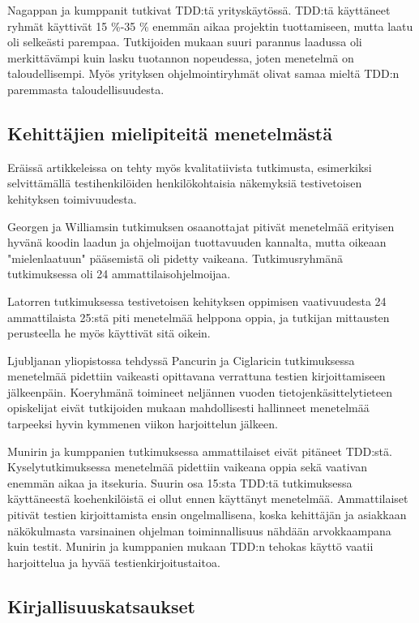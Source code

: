 \documentclass[finnish]{tktltiki2}
\theoremstyle{definition}
\theoremstyle{remark}
\begin{document}
Nagappan ja kumppanit \cite{Nagappan08} tutkivat TDD:tä yrityskäytössä. TDD:tä käyttäneet ryhmät käyttivät 15 \%-35 \% enemmän aikaa projektin tuottamiseen, mutta laatu oli selkeästi parempaa. Tutkijoiden mukaan suuri parannus laadussa oli merkittävämpi kuin lasku tuotannon nopeudessa, joten menetelmä on taloudellisempi. Myös yrityksen ohjelmointiryhmät olivat samaa mieltä TDD:n paremmasta taloudellisuudesta.

\subsection{Kehittäjien mielipiteitä menetelmästä}

Eräissä artikkeleissa on tehty myös kvalitatiivista tutkimusta, esimerkiksi selvittämällä testihenkilöiden henkilökohtaisia näkemyksiä testivetoisen kehityksen toimivuudesta.

Georgen ja Williamsin \cite{George04} tutkimuksen osaanottajat pitivät menetelmää erityisen hyvänä koodin laadun ja ohjelmoijan tuottavuuden kannalta, mutta oikeaan "mielenlaatuun" pääsemistä oli pidetty vaikeana. Tutkimusryhmänä tutkimuksessa oli 24 ammattilaisohjelmoijaa.

Latorren \cite{Latorre14} tutkimuksessa testivetoisen kehityksen oppimisen vaativuudesta 24 ammattilaista 25:stä piti menetelmää helppona oppia, ja tutkijan mittausten perusteella he myös käyttivät sitä oikein.

Ljubljanan yliopistossa tehdyssä Pancurin ja Ciglaricin\cite{Pancur11} tutkimuksessa menetelmää pidettiin vaikeasti opittavana verrattuna testien kirjoittamiseen jälkeenpäin. Koeryhmänä toimineet neljännen vuoden tietojenkäsittelytieteen opiskelijat eivät tutkijoiden mukaan mahdollisesti hallinneet menetelmää tarpeeksi hyvin kymmenen viikon harjoittelun jälkeen.

Munirin ja kumppanien \cite{Munir14} tutkimuksessa ammattilaiset eivät pitäneet TDD:stä. Kyselytutkimuksessa menetelmää pidettiin vaikeana oppia sekä vaativan enemmän aikaa ja itsekuria. Suurin osa 15:sta TDD:tä tutkimuksessa käyttäneestä koehenkilöistä ei ollut ennen käyttänyt menetelmää. Ammattilaiset pitivät testien kirjoittamista ensin ongelmallisena, koska kehittäjän ja asiakkaan näkökulmasta varsinainen ohjelman toiminnallisuus nähdään arvokkaampana kuin testit. Munirin ja kumppanien mukaan TDD:n tehokas käyttö vaatii harjoittelua ja hyvää testienkirjoitustaitoa.


\subsection{Kirjallisuuskatsaukset}
\end{document}
